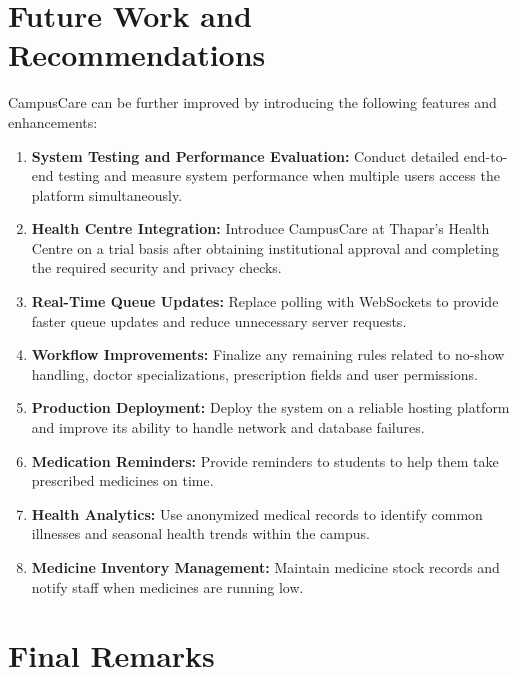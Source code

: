 \documentclass[a4paper,oneside,openany]{tietreport}
\begin{document}
\section{Future Work and Recommendations}

CampusCare can be further improved by introducing
the following features and enhancements:

\begin{enumerate}

    \item \textbf{System Testing and Performance
    Evaluation:}
    Conduct detailed end-to-end testing and measure
    system performance when multiple users access
    the platform simultaneously.

    \item \textbf{Health Centre Integration:}
    Introduce CampusCare at Thapar's Health Centre
    on a trial basis after obtaining institutional
    approval and completing the required security
    and privacy checks.

    \item \textbf{Real-Time Queue Updates:}
    Replace polling with WebSockets to provide
    faster queue updates and reduce unnecessary
    server requests.

    \item \textbf{Workflow Improvements:}
    Finalize any remaining rules related to no-show
    handling, doctor specializations, prescription
    fields and user permissions.

    \item \textbf{Production Deployment:}
    Deploy the system on a reliable hosting platform
    and improve its ability to handle network and
    database failures.

    \item \textbf{Medication Reminders:}
    Provide reminders to students to help them
    take prescribed medicines on time.

    \item \textbf{Health Analytics:}
    Use anonymized medical records to identify
    common illnesses and seasonal health trends
    within the campus.

    \item \textbf{Medicine Inventory Management:}
    Maintain medicine stock records and notify staff
    when medicines are running low.

\end{enumerate}


\section{Final Remarks}
\end{document}
